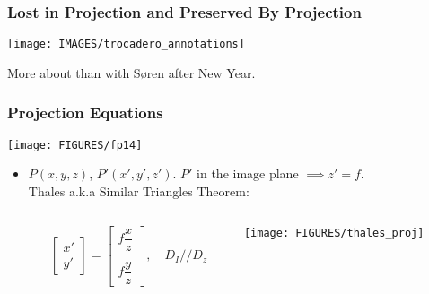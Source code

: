 \documentclass[9pt]{beamer}
\begin{document}




\begin{frame}
  \frametitle{Lost in Projection and Preserved By Projection}
    \begin{center}
    \texttt{[image: IMAGES/trocadero\_annotations]}
  \end{center}
  More about than with S{\o}ren after New Year.
\end{frame}



\begin{frame}
  \frametitle{Projection Equations}
  \begin{center}
    \texttt{[image: FIGURES/fp14]}
  \end{center}
  \begin{itemize}
  \item  $P (x,y,z)$, $P' (x',y',z')$. $P'$ in the image plane $\implies z' = f$.\\
    Thales a.k.a Similar Triangles Theorem:
   
  \end{itemize}
  \begin{columns}
    \begin{column}{0.5\textwidth}
    $$~~~~~~~~~
    \begin{bmatrix}x'\\
      y'
    \end{bmatrix}=
    \begin{bmatrix}
      f\dfrac{x}{z}\\~\\
      f\dfrac{y}{z}
    \end{bmatrix},\quad
    D_I//D_z
    $$   
    \end{column}
    \begin{column}{0.5\textwidth}
      \texttt{[image: FIGURES/thales\_proj]}
    \end{column}
  \end{columns}
\end{frame}
\end{document}
